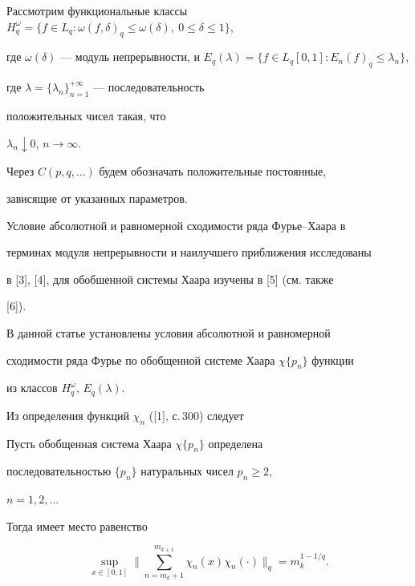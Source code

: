 Рассмотрим функциональные классы $H^\omega_q=\{f\in 


L_q:\omega(f,\delta)_q\le\omega(\delta),\ 0\le\delta\le1\}$, 


где $\omega(\delta)$ --- модуль непрерывности, и $E_q(\lambda)=\{f\in 


L_q[0,1]:E_n(f)_q\le\lambda_n\}$, 


где $\lambda=\{\lambda_n\}^{+\infty}_{n=1}$ --- последовательность 


положительных чисел такая, что 


$\lambda_n\downarrow0$, $n\to\infty$. 


Через $C(p,q,\dotsc)$ будем обозначать положительные постоянные,


зависящие от указанных параметров. 


 


Условие абсолютной и равномерной сходимости ряда Фурье--Хаара в 


терминах модуля непрерывности и наилучшего приближения исследованы 


в [3], [4], для обобшенной системы Хаара изучены в [5] (см. также 


[6]). 


 


В данной статье установлены условия абсолютной и равномерной 


сходимости ряда Фурье по обобщенной системе Хаара $\chi\{p_n\}$ функции 


из классов $H^\omega_q$, $E_q(\lambda)$. 





Из определения функций $\chi_n$ ([1], с.\,300) следует 


 


\begin{lem} 


Пусть обобщенная система Хаара $\chi\{p_n\}$ определена 


последовательностью $\{p_n\}$ натуральных чисел $p_n\ge2$, 


$n=1,2,\dotsc$ 


Тогда имеет место равенство 


$$ 


\sup_{x\in[0,1]}\bigg\|\sum^{m_{k+1}}_{n=m_k+1} 


\chi_n(x)\chi_n(\cdot)\bigg\|_q=m^{1-1/q}_k. 


$$ 


\end{lem} 


